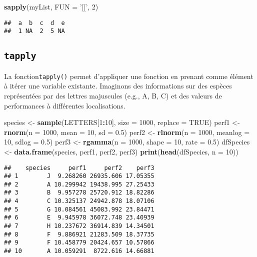 \documentclass[]{book}
\newenvironment{Shaded}{\begin{snugshade}}{\end{snugshade}}
\newcommand{\KeywordTok}[1]{\textcolor[rgb]{0.13,0.29,0.53}{\textbf{#1}}}
\newcommand{\DataTypeTok}[1]{\textcolor[rgb]{0.13,0.29,0.53}{#1}}
\newcommand{\DecValTok}[1]{\textcolor[rgb]{0.00,0.00,0.81}{#1}}
\newcommand{\FloatTok}[1]{\textcolor[rgb]{0.00,0.00,0.81}{#1}}
\newcommand{\StringTok}[1]{\textcolor[rgb]{0.31,0.60,0.02}{#1}}
\newcommand{\OtherTok}[1]{\textcolor[rgb]{0.56,0.35,0.01}{#1}}
\newcommand{\OperatorTok}[1]{\textcolor[rgb]{0.81,0.36,0.00}{\textbf{#1}}}
\newcommand{\NormalTok}[1]{#1}
\theoremstyle{definition}
\theoremstyle{definition}
\theoremstyle{definition}
\theoremstyle{remark}
\begin{document}
\begin{Shaded}
\begin{Highlighting}[]
\KeywordTok{sapply}\NormalTok{(myList, }\DataTypeTok{FUN =} \StringTok{'[['}\NormalTok{, }\DecValTok{2}\NormalTok{)}
\end{Highlighting}
\end{Shaded}

\begin{verbatim}
##  a  b  c  d  e 
##  1 NA  2  5 NA
\end{verbatim}

\subsection{\texorpdfstring{\texttt{tapply}}{tapply}}\label{l17tapply}

La fonction\texttt{tapply()} permet d'appliquer une fonction en prenant
comme élément à itérer une variable existante. Imaginons des
informations sur des espèces représentées par des lettres majuscules
(e.g., A, B, C) et des valeurs de performances à différentes
localisations.

\begin{Shaded}
\begin{Highlighting}[]
\NormalTok{species <-}\StringTok{ }\KeywordTok{sample}\NormalTok{(LETTERS[}\DecValTok{1}\OperatorTok{:}\DecValTok{10}\NormalTok{], }\DataTypeTok{size =} \DecValTok{1000}\NormalTok{, }\DataTypeTok{replace =} \OtherTok{TRUE}\NormalTok{)}
\NormalTok{perf1 <-}\StringTok{ }\KeywordTok{rnorm}\NormalTok{(}\DataTypeTok{n =} \DecValTok{1000}\NormalTok{, }\DataTypeTok{mean =} \DecValTok{10}\NormalTok{, }\DataTypeTok{sd =} \FloatTok{0.5}\NormalTok{)}
\NormalTok{perf2 <-}\StringTok{ }\KeywordTok{rlnorm}\NormalTok{(}\DataTypeTok{n =} \DecValTok{1000}\NormalTok{, }\DataTypeTok{meanlog =} \DecValTok{10}\NormalTok{, }\DataTypeTok{sdlog =} \FloatTok{0.5}\NormalTok{)}
\NormalTok{perf3 <-}\StringTok{ }\KeywordTok{rgamma}\NormalTok{(}\DataTypeTok{n =} \DecValTok{1000}\NormalTok{, }\DataTypeTok{shape =} \DecValTok{10}\NormalTok{, }\DataTypeTok{rate =} \FloatTok{0.5}\NormalTok{)}
\NormalTok{dfSpecies <-}\StringTok{ }\KeywordTok{data.frame}\NormalTok{(species, perf1, perf2, perf3)}
\KeywordTok{print}\NormalTok{(}\KeywordTok{head}\NormalTok{(dfSpecies, }\DataTypeTok{n =} \DecValTok{10}\NormalTok{))}
\end{Highlighting}
\end{Shaded}

\begin{verbatim}
##    species     perf1     perf2    perf3
## 1        J  9.268260 26935.606 17.05355
## 2        A 10.299942 19438.995 27.25433
## 3        B  9.957278 25720.912 18.82286
## 4        C 10.325137 24942.878 18.07106
## 5        G 10.084561 45083.992 23.84471
## 6        E  9.945978 36072.748 23.40939
## 7        H 10.237672 36914.839 14.34501
## 8        F  9.886921 21283.509 18.37735
## 9        F 10.458779 20424.657 10.57866
## 10       A 10.059291  8722.616 14.66881
\end{verbatim}
\end{document}

